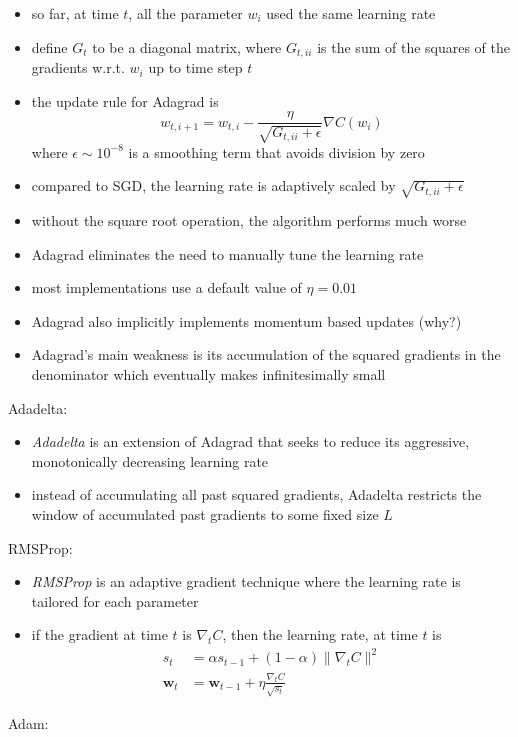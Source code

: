 \documentclass[onecolumn]{IEEEtran}
\newcommand{\beq}{\begin{equation}}
\newcommand{\eeq}{\end{equation}}
\newcommand{\bi}{\begin{itemize}}
\newcommand{\ei}{\end{itemize}}
\begin{document}
\begin{itemize}
        \item so far, at time $t$, all the parameter $w_i$ used the same learning rate
        \item define $G_{t}$ to be a diagonal matrix, where $G_{t,ii}$ is the sum of the squares of the gradients w.r.t. $w_i$ up to time step $t$
        \item the update rule for Adagrad is
        \beq
            w_{t,i+1} = w_{t,i} - \frac{\eta}{\sqrt{G_{t,ii}+\epsilon}} \nabla C(w_i)
        \eeq
        where $\epsilon \sim 10^{-8}$ is a smoothing term that avoids division by zero
        \item compared to SGD, the learning rate is adaptively scaled by $\sqrt{G_{t,ii}+\epsilon}$
        \item without the square root operation, the algorithm performs much worse
        \item Adagrad eliminates the need to manually tune the learning rate
        \item most implementations use a default value of $\eta = 0.01$
        \item Adagrad also implicitly implements momentum based updates (why?)
        \item Adagrad's main weakness is its accumulation of the squared gradients in the denominator which eventually makes infinitesimally small
    \ei
    \item Adadelta:
    \bi
        \item \emph{Adadelta} is an extension of Adagrad that seeks to reduce its aggressive, monotonically decreasing learning rate
        \item instead of accumulating all past squared gradients, Adadelta restricts the window of accumulated past gradients to some fixed size $L$
    \ei
    \item  RMSProp:
    \bi
        \item  \emph{RMSProp} is an adaptive gradient technique where the learning rate is tailored for each parameter
        \item if the gradient at time $t$ is $\nabla_t C$, then the learning rate, at time $t$ is
        \beq\label{rmsprop}\begin{split}
            s_t   &= \alpha s_{t-1} + (1-\alpha)\|\nabla_t C\|^2\\
            \bm{w}_t &= \bm{w}_{t-1} + \eta \frac{\nabla_t C}{\sqrt{s_t}}
        \end{split}\eeq
    \ei
    \item Adam:
    \bi

\end{itemize}
\end{document}
